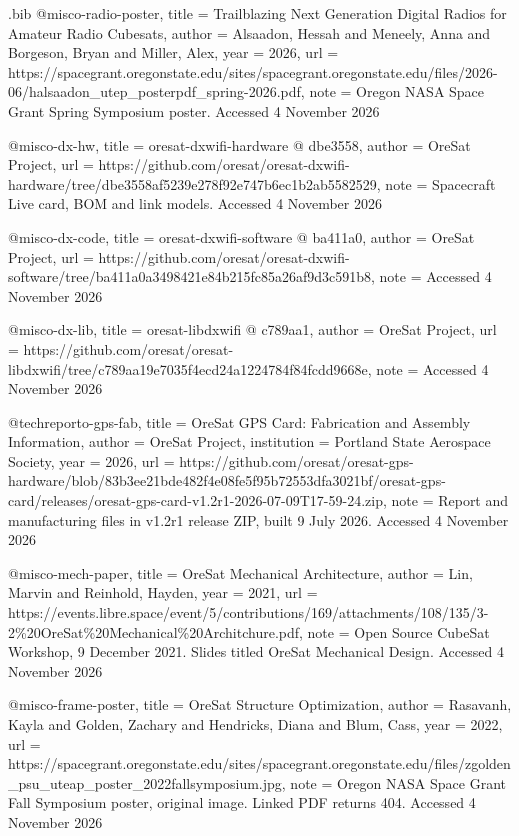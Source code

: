 \begin{filecontents*}[overwrite]{\jobname.bib}
@misc{o-radio-poster,
  title = {{Trailblazing Next Generation Digital Radios for Amateur Radio Cubesats}},
  author = {Alsaadon, Hessah and Meneely, Anna and Borgeson, Bryan and Miller, Alex},
  year = {2026},
  url = {https://spacegrant.oregonstate.edu/sites/spacegrant.oregonstate.edu/files/2026-06/halsaadon_utep_posterpdf_spring-2026.pdf},
  note = {Oregon NASA Space Grant Spring Symposium poster. Accessed 4 November 2026}
}

@misc{o-dx-hw,
  title = {{oresat-\allowbreak{}dxwifi-\allowbreak{}hardware @ dbe3558}},
  author = {{OreSat Project}},
  url = {https://github.com/oresat/oresat-dxwifi-hardware/tree/dbe3558af5239e278f92e747b6ec1b2ab5582529},
  note = {Spacecraft Live card, BOM and link models. Accessed 4 November 2026}
}

@misc{o-dx-code,
  title = {{oresat-\allowbreak{}dxwifi-\allowbreak{}software @ ba411a0}},
  author = {{OreSat Project}},
  url = {https://github.com/oresat/oresat-dxwifi-software/tree/ba411a0a3498421e84b215fc85a26af9d3c591b8},
  note = {Accessed 4 November 2026}
}

@misc{o-dx-lib,
  title = {{oresat-\allowbreak{}libdxwifi @ c789aa1}},
  author = {{OreSat Project}},
  url = {https://github.com/oresat/oresat-libdxwifi/tree/c789aa19e7035f4ecd24a1224784f84fcdd9668e},
  note = {Accessed 4 November 2026}
}

@techreport{o-gps-fab,
  title = {{OreSat GPS Card: Fabrication and Assembly Information}},
  author = {{OreSat Project}},
  institution = {Portland State Aerospace Society},
  year = {2026},
  url = {https://github.com/oresat/oresat-gps-hardware/blob/83b3ee21bde482f4e08fe5f95b72553dfa3021bf/oresat-gps-card/releases/oresat-gps-card-v1.2r1-2026-07-09T17-59-24.zip},
  note = {Report and manufacturing files in v1.2r1 release ZIP, built 9 July 2026. Accessed 4 November 2026}
}

@misc{o-mech-paper,
  title = {{OreSat Mechanical Architecture}},
  author = {Lin, Marvin and Reinhold, Hayden},
  year = {2021},
  url = {https://events.libre.space/event/5/contributions/169/attachments/108/135/3-2\%20OreSat\%20Mechanical\%20Architchure.pdf},
  note = {Open Source CubeSat Workshop, 9 December 2021. Slides titled OreSat Mechanical Design. Accessed 4 November 2026}
}

@misc{o-frame-poster,
  title = {{OreSat Structure Optimization}},
  author = {Rasavanh, Kayla and Golden, Zachary and Hendricks, Diana and Blum, Cass},
  year = {2022},
  url = {https://spacegrant.oregonstate.edu/sites/spacegrant.oregonstate.edu/files/zgolden_psu_uteap_poster_2022fallsymposium.jpg},
  note = {Oregon NASA Space Grant Fall Symposium poster, original image. Linked PDF returns 404. Accessed 4 November 2026}
}


\end{filecontents*}
